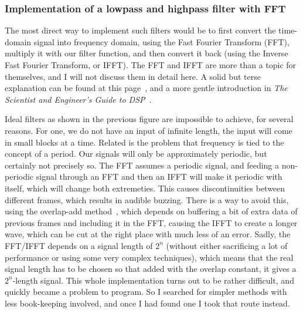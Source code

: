 \documentclass[11pt,a4paper]{article}
\begin{document}
\begin{figure}
\end{figure}

\subsubsection{Implementation of a lowpass and highpass filter with FFT}

The most direct way to implement such filters would be to first convert the time-domain signal into frequency domain, using the Fast Fourier Transform (FFT), multiply it with our filter function, and then convert it back (using the Inverse Fast Fourier Transform, or IFFT). The FFT and IFFT are more than a topic for themselves, and I will not discuss them in detail here. A solid but terse explanation can be found at this page~\cite{DITFFT}, and a more gentle introduction in \emph{The Scientist and Engineer's Guide to DSP}~\cite[chap. 12]{SmithDSP}.

Ideal filters as shown in the previous figure are impossible to achieve, for several reasons. For one, we do not have an input of infinite length, the input will come in small blocks at a time. Related is the problem that frequency is tied to the concept of a period. Our signals will only be approximately periodic, but certainly not precisely so. The FFT assumes a periodic signal, and feeding a non-periodic signal through an FFT and then an IFFT will make it periodic with itself, which will change both extremeties. This causes discontinuities between different frames, which results in audible buzzing. There is a way to avoid this, using the overlap-add method~\cite{Overlapadd}, which depends on buffering a bit of extra data of previous frames and including it in the FFT, causing the IFFT to create a longer wave, which can be cut at the right place with much less of an error.
Sadly, the FFT/IFFT depends on a signal length of $2^n$ (without either sacrificing a lot of performance or using some very complex techniques), which means that the real signal length has to be chosen so that added with the overlap constant, it gives a $2^n$-length signal. This whole implementation turns out to be rather difficult, and quickly became a problem to program. So I searched for simpler methods with less book-keeping involved, and once I had found one I took that route instead.
\end{document}
